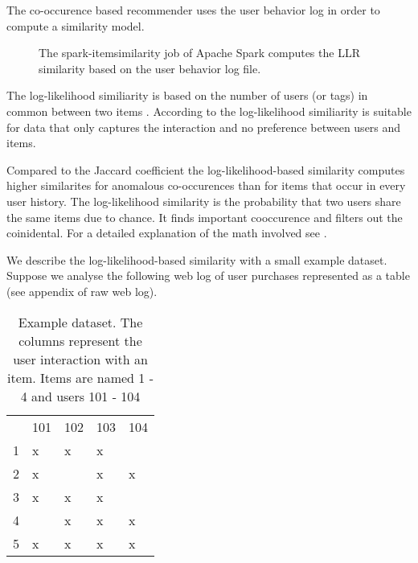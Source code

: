 The co-occurence based recommender uses the user behavior log in order to compute a similarity model. 

\begin{figure}
\centering
{}
\caption{The {\ttfamily spark-itemsimilarity} job of Apache Spark computes the LLR similarity based on the user behavior log file.}
\end{figure}

 The log-likelihood similiarity is based on the number of users (or tags) in common between two items \cite{montgomery}. According to \cite{Dunning93} the log-likelihood similiarity is suitable for data that only captures the interaction and no preference between users and items. 

Compared to the Jaccard coefficient \cite{Hartung} the log-likelihood-based similarity computes higher similarites for anomalous co-occurences than for items that occur in every user history. The log-likelihood similarity  is the probability that two users share the same items due to chance. It finds important cooccurence and filters out the coinidental. For a detailed explanation of the math involved see \cite{Dunning93}. 

We describe the log-likelihood-based similarity with a small example dataset. Suppose we analyse the following web log of user purchases represented as a table (see appendix of raw web log).

\begin{table}
\begin{center}
\begin{tabular}{rllll}
 & 101 & 102 & 103 & 104\\
1 & x & x & x & \\
2 & x &  & x & x\\
3 & x & x & x & \\
4 &  & x & x & x\\
5 & x & x & x & x\\
\end{tabular}
\end{center}
\caption{Example dataset. The columns represent the user interaction with an item. Items are named 1 - 4 and users 101 - 104}
\label{tbl:llr}
\end{table}

